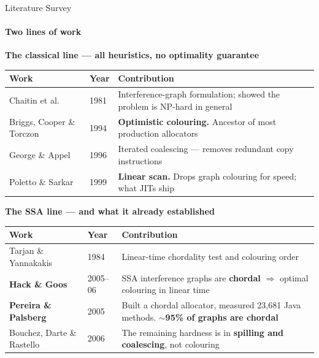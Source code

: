 \documentclass[aspectratio=169,11pt]{beamer}
\begin{document}
\begin{frame}{Literature Survey}
\framesubtitle{Two lines of work}
\vspace{-1mm}
{\footnotesize\textbf{The classical line --- all heuristics, no optimality guarantee}}\par\vspace{1mm}
{\scriptsize
\begin{tabular}{@{}p{3.6cm}p{1.1cm}p{8.2cm}@{}}
\toprule
Work & Year & Contribution \\
\midrule
Chaitin et al.              & 1981 & Interference-graph formulation; showed the problem is NP-hard in general \\
Briggs, Cooper \& Torczon   & 1994 & \textbf{Optimistic colouring.} Ancestor of most production allocators \\
George \& Appel             & 1996 & Iterated coalescing --- removes redundant copy instructions \\
Poletto \& Sarkar           & 1999 & \textbf{Linear scan.} Drops graph colouring for speed; what JITs ship \\
\bottomrule
\end{tabular}}\par\vspace{2.5mm}
{\footnotesize\textbf{The SSA line --- and what it already established}}\par\vspace{1mm}
{\scriptsize
\begin{tabular}{@{}p{3.6cm}p{1.1cm}p{8.2cm}@{}}
\toprule
Work & Year & Contribution \\
\midrule
Tarjan \& Yannakakis          & 1984    & Linear-time chordality test and colouring order \\
\textbf{Hack \& Goos}         & 2005--06& SSA interference graphs are \textbf{chordal} $\Rightarrow$ optimal colouring in linear time \\
\textbf{Pereira \& Palsberg}  & 2005    & Built a chordal allocator, measured 23,681 Java methods. \textbf{$\sim$95\% of graphs are chordal} \\
Bouchez, Darte \& Rastello    & 2006    & The remaining hardness is in \textbf{spilling and coalescing}, not colouring \\
\bottomrule
\end{tabular}}
\end{frame}
\end{document}
